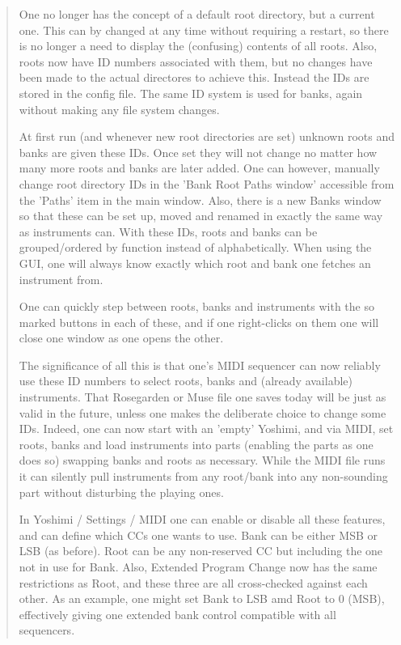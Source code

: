    \begin{quotation}
      One no longer has the concept of a default root directory, but a current
      one. This can by changed at any time without requiring a restart, so
      there is no longer a need to display the (confusing) contents of all
      roots. Also, roots now have ID numbers associated with them, but no
      changes have been made to the actual directores to achieve this. Instead
      the IDs are stored in the config file. The same ID system is used for
      banks, again without making any file system changes.

      At first run (and whenever new root directories are set) unknown roots
      and banks are given these IDs. Once set they will not change no matter
      how many more roots and banks are later added. One can however, manually
      change root directory IDs in the 'Bank Root Paths window' accessible from
      the 'Paths' item in the main window. Also, there is a new Banks window so
      that these can be set up, moved and renamed in exactly the same way as
      instruments can.  With these IDs, roots and banks can be grouped/ordered
      by function instead of alphabetically. When using the GUI, one will
      always know exactly which root and bank one fetches an instrument from.

      One can quickly step between roots, banks and instruments with the so
      marked buttons in each of these, and if one right-clicks on them one will
      close one window as one opens the other.

      The significance of all this is that one's MIDI sequencer can now
      reliably use these ID numbers to select roots, banks and (already
      available) instruments. That Rosegarden or Muse file one saves today will
      be just as valid in the future, unless one makes the deliberate choice to
      change some IDs. Indeed, one can now start with an 'empty' Yoshimi, and
      via MIDI, set roots, banks and load instruments into parts (enabling the
      parts as one does so) swapping banks and roots as necessary. While the
      MIDI file runs it can silently pull instruments from any root/bank into
      any non-sounding part without disturbing the playing ones.

      In Yoshimi / Settings / MIDI one can enable or disable all these features,
      and can define which CCs one wants to use. Bank can be either MSB or LSB
      (as before). Root can be any non-reserved CC but including the one not in
      use for Bank. Also, Extended Program Change now has the same restrictions
      as Root, and these three are all cross-checked against each other. As an
      example, one might set Bank to LSB amd Root to 0 (MSB), effectively
      giving one extended bank control compatible with all sequencers.


\end{quotation}
